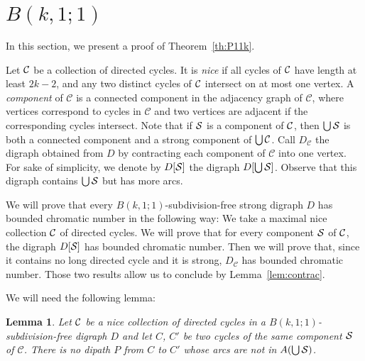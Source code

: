 \documentclass[utf8,10pt]{article}
\theoremstyle{plain}
\newtheorem{lemma}[theorem]{Lemma}
\theoremstyle{definition}
\theoremstyle{remark}
\begin{document}
\section{$B(k,1;1)$}\label{sec:k,1,1}



In this section, we present a proof of Theorem~\ref{th:P11k}.

Let  ${\cal C}$ be a collection of directed cycles. It is {\it nice} if all cycles of ${\cal C}$ have length at least $2k-2$, and
any two distinct cycles of ${\cal C}$ intersect on at most one vertex. %
A {\it component} of $\mathcal{C}$ is a connected component in the adjacency graph of $\mathcal{C}$, where vertices correspond to cycles in $\mathcal{C}$
and two vertices are adjacent if the corresponding cycles intersect. Note that if ${\cal S}$ is a component of ${\cal C}$, then $\bigcup{\cal S}$ is 
both a connected component and a strong component of $\bigcup{\cal C}$.
Call $D_{\mathcal{C}}$ the digraph obtained from $D$ by contracting each component of $\mathcal{C}$ into one vertex. 
For sake of simplicity, we denote by $D[{\cal S}]$ the digraph $D[\bigcup {\cal S}]$. Observe that this digraph contains $\bigcup {\cal S}$ but has more arcs.


We will prove that every $B(k,1;1)$-subdivision-free strong digraph $D$ has bounded chromatic number in the following way:
We take a maximal nice collection ${\cal C}$ of directed cycles. 
We will prove that for every component ${\cal S}$ of ${\cal C}$, the digraph $D[{\cal S}]$ has bounded chromatic number. 
Then we will prove that, since it contains no long directed cycle and it is strong, $D_{\mathcal{C}}$ has bounded chromatic number.
Those two results allow us to conclude by Lemma~\ref{lem:contrac}.

We will need the following lemma:



\begin{lemma}\label{lem:headphone}
Let ${\cal C}$ be a nice collection of directed cycles in a $B(k,1;1)$-subdivision-free digraph $D$ and let $C$, $C'$ be two cycles of the same
component ${\cal S}$ of $\mathcal{C}$. There is no dipath $P$ from $C$ to $C'$ whose arcs are not in $A (\bigcup  {\cal S})$. 
\end{lemma}
\end{document}
